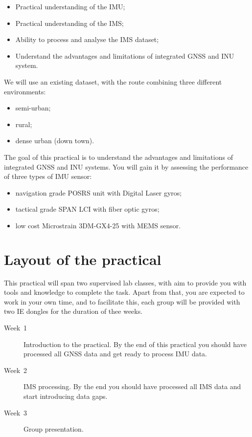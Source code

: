 \documentclass[british]{book}
\begin{document}
\begin{itemize}
	\item Practical understanding of the IMU;
	\item Practical understanding of the IMS;
	\item Ability to process and analyse the IMS dataset;
	\item Understand the advantages and limitations of integrated GNSS and INU system.

\end{itemize}

We will use an existing dataset, with the route combining three different environments:

\begin{itemize}
	\item semi-urban;
	\item rural;
	\item dense urban (down town).
\end{itemize}

The goal of this practical is to understand the advantages and limitations of integrated GNSS and INU systems. You will gain it by assessing the performance of three types of IMU sensor:

\begin{itemize}
	\item navigation grade POSRS unit with Digital Laser gyros;
	\item tactical grade SPAN LCI with fiber optic gyros;
	\item low cost Microstrain 3DM-GX4-25 with MEMS sensor.
\end{itemize}


\section{Layout of the practical}

This practical will span two supervised lab classes, with aim to provide you with tools and knowledge to complete the task. Apart from that, you are expected to work in your own time, and to facilitate this, each group will be provided with two IE dongles for the duration of thee weeks.

\begin{description}
	\item [{Week~1}] Introduction to the practical. By the end of this practical you should
	have processed all GNSS data and get ready to process IMU data.
	\item [{Week~2}] IMS processing. By the end you should have processed
	all IMS data and start introducing data gaps.
	\item [{Week~3}] Group presentation.
\end{description}
\end{document}
